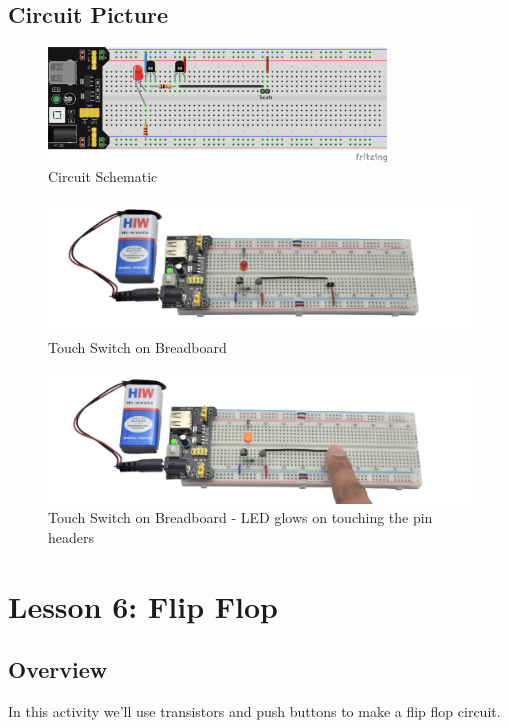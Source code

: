 \subsection{Circuit Picture}
\begin{figure}[htp]
    \centering
    \includegraphics[width=0.8\textwidth]{Pictures/lesson_circuits/BJTs/lesson_5.png}
    \caption{Circuit Schematic}
    \label{fig:simple_touch_sch}
\end{figure}
\begin{figure}[htp]
    \centering
    \includegraphics[width=\textwidth]{Pictures/lesson_circuits/BJTs/LC_7.png}
    \caption{Touch Switch on Breadboard}
    \label{fig:stouch_obb}
\end{figure}
\begin{figure}[htp]
    \centering
    \includegraphics[width=\textwidth]{Pictures/lesson_circuits/BJTs/LC_8.png}
    \caption{Touch Switch on Breadboard - LED glows on touching the pin headers}
    \label{fig:stouch_on_obb} 
\end{figure}


\section{Lesson 6: Flip Flop}
\subsection{Overview}
In this activity we'll use transistors and push buttons to make a flip flop circuit.

